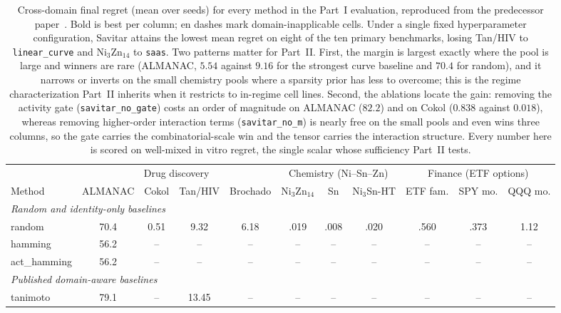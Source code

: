 \documentclass{article}
\begin{document}
\begin{table}[t]
\caption{Cross-domain final regret (mean over seeds) for every method in the Part~I evaluation,
reproduced from the predecessor paper~\citep{gonehal2026savitar}. Bold is best per column; en dashes mark domain-inapplicable
cells. Under a single fixed hyperparameter configuration, Savitar attains the lowest mean regret on
eight of the ten primary benchmarks, losing Tan/HIV to \texttt{linear\_curve} and Ni$_3$Zn$_{14}$ to
\texttt{saas}. Two patterns matter for Part~II. First, the margin is largest exactly where the pool
is large and winners are rare (ALMANAC, $5.54$ against $9.16$ for the strongest curve baseline and
$70.4$ for random), and it narrows or inverts on the small chemistry pools where a sparsity prior
has less to overcome; this is the regime characterization Part~II inherits when it restricts to
in-regime cell lines. Second, the ablations locate the gain: removing the activity gate
(\texttt{savitar\_no\_gate}) costs an order of magnitude on ALMANAC ($82.2$) and on Cokol
($0.838$ against $0.018$), whereas removing higher-order interaction terms (\texttt{savitar\_no\_m})
is nearly free on the small pools and even wins three columns, so the gate carries the
combinatorial-scale win and the tensor carries the interaction structure. Every number here is
scored on well-mixed in vitro regret, the single scalar whose sufficiency Part~II tests.}
\label{tab:crossdomain}
\vskip 0.1in
\centering
\scriptsize
\setlength{\tabcolsep}{3.2pt}
\begin{tabular}{l cccc ccc ccc}
\toprule
& \multicolumn{4}{c}{Drug discovery} & \multicolumn{3}{c}{Chemistry (Ni--Sn--Zn)} & \multicolumn{3}{c}{Finance (ETF options)} \\
\cmidrule(lr){2-5}\cmidrule(lr){6-8}\cmidrule(lr){9-11}
Method & ALMANAC & Cokol & Tan/HIV & Brochado & Ni$_3$Zn$_{14}$ & Sn & Ni$_3$Sn-HT & ETF fam. & SPY mo. & QQQ mo. \\
\midrule
\multicolumn{11}{l}{\emph{Random and identity-only baselines}}\\
random & 70.4 & 0.51 & 9.32 & 6.18 & .019 & .008 & .020 & .560 & .373 & 1.12 \\
hamming & 56.2 & -- & -- & -- & -- & -- & -- & -- & -- & -- \\
act\_hamming & 56.2 & -- & -- & -- & -- & -- & -- & -- & -- & -- \\
\multicolumn{11}{l}{\emph{Published domain-aware baselines}}\\
tanimoto & 79.1 & -- & 13.45 & -- & -- & -- & -- & -- & -- & -- \\

\end{tabular}
\end{table}
\end{document}
